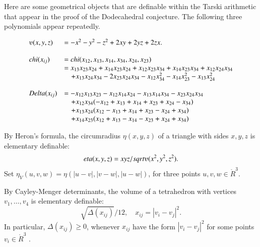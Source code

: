 Here are some geometrical 
objects that are definable within the Tarski arithmetic
that appear in the proof of the Dodecahedral conjecture.
The following three polynomials appear repeatedly.
\begin{definition}
$$
\begin{array}{lll}
\ups(x,y,z) &= -x^2 - y^2 - z^2 + 2 x y + 2 y z + 2 z x.\\
\\
 \chi(x_{ij}) &= \chi(x_{12},x_{13},x_{14},x_{34},x_{24},x_{23})\\
     &=
      x_{13} x_{23} x_{24} + x_{14} x_{23} x_{24}  + 
      x_{12} x_{23} x_{34} + x_{14} x_{23} x_{34} + x_{12} x_{24} x_{34}\\ 
      &\quad + x_{13} x_{24} x_{34} - 
      2 x_{23} x_{24} x_{34} - x_{12} x_{34}^2 
      - x_{14} x_{23}^2 - x_{13} x_{24}^2\\
\\
\Delta(x_{ij}) &= 
   -x_{12} x_{13} x_{23} - x_{12} x_{14} x_{24} - x_{13} x_{14} x_{34} 
    - x_{23} x_{24} x_{34}\\
    &\quad + x_{12} x_{34} (-x_{12} + x_{13} + x_{14} + x_{23} + x_{24} - x_{34}) \\
  &\quad + x_{13} x_{24} (x_{12} - x_{13} + x_{14} + x_{23} - x_{24} + x_{34})\\
    &\quad + x_{14} x_{23} (x_{12} + x_{13} - x_{14} - x_{23} + x_{24} + x_{34})\\
\end{array}
    \label{def:chi}
\label{def:tar:delta}
\label{def:ups}
$$
\end{definition}

By Heron's formula, the circumradius $\eta(x,y,z)$ of a triangle with sides $x,y,z$ is elementary definable:
$$\eta(x,y,z) = x y z/\sqrt{\ups(x^2,y^2,z^2)}.$$
Set $\eta_V(u,v,w) = \eta(|u-v|,|v-w|,|u-w|)$, for three points
$u,v,w\in\ring{R}^3$.

By Cayley-Menger determinants, the volume  of a tetrahedron with vertices $v_1,\ldots,v_4$ is elementary definable:
   $$
   \sqrt{\Delta(x_{ij})}/12,\quad x_{ij}=|v_i-v_j|^2.
   $$
In particular, $\Delta(x_{ij})\ge0$, whenever $x_{ij}$ have
the form $|v_i-v_j|^2$ for some points $v_i\in\ring{R}^3$
\cite[Lemma~8.1.4]{Part1}.


